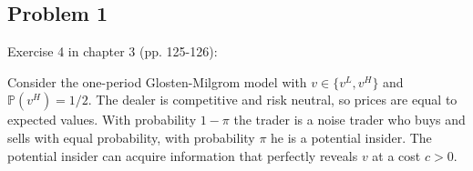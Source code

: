 \documentclass[11pt
]{exam}
\begin{document}
%
%	





\qquad
\subsection*{Problem 1}

Exercise 4 in chapter 3 (pp. 125-126):

Consider the one-period Glosten-Milgrom model with $v \in \{v^L, v^H\}$ and $\mathbb{P}(v^H)=1/2$. The dealer is competitive and risk neutral, so prices are equal to expected values. With probability $1-\pi$ the trader is a noise trader who buys and sells with equal probability, with probability $\pi$ he is a potential insider. The potential insider can acquire information that perfectly reveals $v$ at a cost $c>0$.
\end{document}
